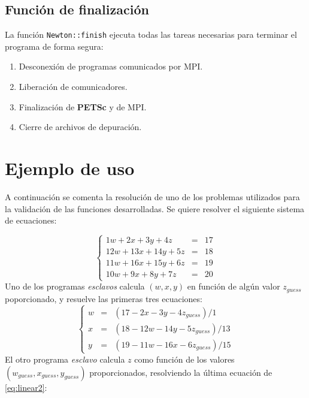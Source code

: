 \subsection*{Función de finalización}
\label{ap2:newton-finish}

La función \texttt{Newton::finish} ejecuta todas las tareas necesarias para terminar el programa de forma segura:
\begin{enumerate}
\item Desconexión de programas comunicados por MPI.
\item Liberación de comunicadores.
\item Finalización de \textbf{PETSc} y de MPI.
\item Cierre de archivos de depuración.
\end{enumerate}

\section{Ejemplo de uso}
\label{ap2:ejemplo}

A continuación se comenta la resolución de uno de los problemas utilizados para la validación de las funciones desarrolladas.
Se quiere resolver el siguiente sistema de ecuaciones:

\begin{equation}
\left\{ \begin{array}{rcl}
  1w +  2x +  3y +  4z &=& 17 \\
 12w + 13x + 14y +  5z &=& 18 \\
 11w + 16x + 15y +  6z &=& 19 \\
 10w +  9x +  8y +  7z &=& 20
\end{array}
\right.
\label{eq:linear2}
\end{equation}
Uno de los programas \textit{esclavos} calcula $(w,x,y)$ en función de algún valor $z_{guess}$ poporcionado, y resuelve las primeras tres ecuaciones:
\begin{equation}
\left\{ \begin{array}{rcl}
 w &=& (17 -  2x -  3y - 4z_{guess})/ 1 \\
 x &=& (18 - 12w - 14y - 5z_{guess})/13 \\
 y &=& (19 - 11w - 16x - 6z_{guess})/15
\end{array}
\right.
\label{eq:linear2a}
\end{equation}
El otro programa \textit{esclavo} calcula $z$ como función de los valores $(w_{guess},x_{guess},y_{guess})$ proporcionados, resolviendo la última ecuación de \ref{eq:linear2}:

